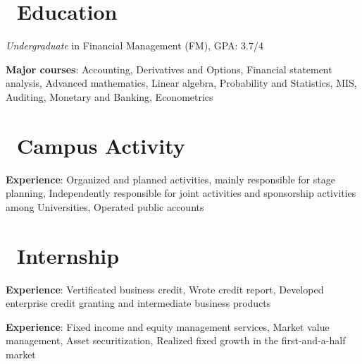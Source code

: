 \documentclass{resume}
\begin{document}


\section{\faGraduationCap\ Education}
\textit{Undergraduate} in Financial Management (FM), GPA: 3.7/4

\textbf{Major courses}: Accounting, Derivatives and Options, Financial statement analysis, Advanced mathematics,
Linear algebra, Probability and Statistics, MIS, Auditing, Monetary and Banking, Econometrics

\section{\faUsers\ Campus Activity}

\textbf{Experience}: Organized and planned activities, mainly responsible for stage planning, Independently responsible for joint activities and sponsorship activities among Universities, Operated public accounts


\section{\faCogs\ Internship}

\textbf{Experience}: Vertificated business credit, Wrote credit report, Developed enterprise credit granting and intermediate business products


\textbf{Experience}: Fixed income and equity management services, Market value management, Asset securitization, Realized fixed growth in the first-and-a-half market

\end{document}
